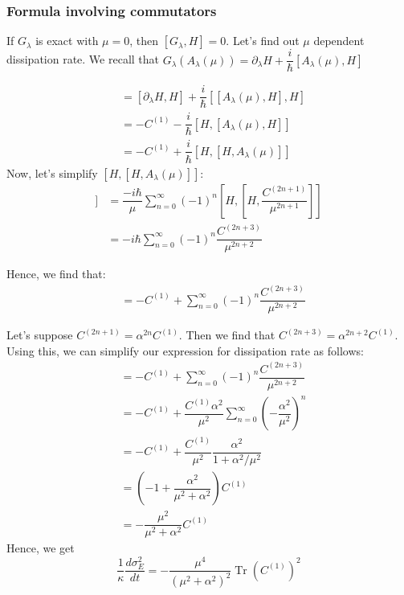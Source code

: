 \documentclass[11pt,a4paper]{article}
\DeclareMathOperator{\Tr}{Tr}
\begin{document}
\subsubsection{Formula involving commutators}
If $G_{\lambda}$ is exact with $\mu =0$, then $[G_{\lambda}, H]=0$. Let's find out $\mu$ dependent dissipation rate. We recall that $G_{\lambda}(A_{\lambda} (\mu) )= \partial_{\lambda} H + \dfrac{i}{\hbar} [A_{\lambda} (\mu), H] $

\begin{align}
[G_{\lambda}(A_{\lambda} (\mu)), H] &=[ \partial_{\lambda} H, H]  + \dfrac{i}{\hbar} [[A_{\lambda} (\mu), H],  H] \\
&=- C^{(1)}  - \dfrac{i}{\hbar} [ H, [A_{\lambda} (\mu), H]] \\
&=- C^{(1)} + \dfrac{i}{\hbar} [ H, [H, A_{\lambda} (\mu)]]
\end{align}
Now, let's simplify $[H,[H, A_{\lambda} (\mu)]]$:
\begin{align}
[H,[H, A_{\lambda} (\mu)]] &= \dfrac{-i\hbar}{\mu}  \sum_{n=0}^{\infty}   (-1)^{n} [H, [H,  \dfrac{ C^{(2n+1)}}{\mu^{2n+1}}]]\\
&= -i\hbar  \sum_{n=0}^{\infty}   (-1)^{n}   \dfrac{ C^{(2n+3)}}{\mu^{2n+2}}
\end{align}

Hence, we find that:
\begin{align}
[G_{\lambda}(A_{\lambda} (\mu)), H] &= - C^{(1)} +  \sum_{n=0}^{\infty}   (-1)^{n}   \dfrac{ C^{(2n+3)}}{\mu^{2n+2}}
\end{align}

Let's suppose $C^{(2n+1)}= \alpha^{2n} C^{(1)}$. Then we find that $C^{(2n+3)}= \alpha^{2n+2} C^{(1)} $. Using this, we can simplify our expression for dissipation rate as follows:
\begin{align}
 [G_{\lambda}(A_{\lambda} (\mu)), H]&=  - C^{(1)} +  \sum_{n=0}^{\infty}   (-1)^{n}   \dfrac{ C^{(2n+3)}}{\mu^{2n+2}}\\
&=  - C^{(1)} +    \dfrac{ C^{(1)}\alpha^2 }{\mu^{2}} \sum_{n=0}^{\infty}   \left(  - \dfrac{ \alpha^{2} }{\mu^{2}}\right)^n \\
&=  - C^{(1)} +    \dfrac{ C^{(1)} }{\mu^{2}} \dfrac{ \alpha^2  }{1 + \alpha^2 / \mu^{2}} \\
&= \left(- 1 +    \dfrac{\alpha^2  }{   \mu^{2}+ \alpha^2 } \right) C^{(1)} \\
&=-\dfrac{\mu^{2} }{   \mu^{2}+ \alpha^2 }  C^{(1)}
\end{align}
Hence, we get 
\begin{equation}
\boxed{\dfrac{1}{ \kappa } \dfrac{d \sigma^2_E}{ dt}= -\dfrac{\mu^{4} }{   (\mu^{2}+ \alpha^2)^2 } \Tr (C^{(1)})^2}
\end{equation}
\end{document}
